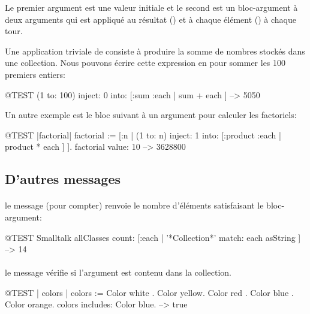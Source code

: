 \documentclass[a4paper,10pt,twoside]{book}
\begin{document}
Le premier argument est une valeur initiale et le second est un bloc-argument
\`a deux arguments qui est appliqu\'e au r\'esultat () et \`a chaque \'el\'ement () \`a chaque tour.

Une application triviale de   consiste \`a produire 
la somme de nombres stock\'es dans une collection.
Nous pouvons \'ecrire cette expression en \sq pour sommer
les 100 premiers entiers:
\begin{code}{@TEST}
(1 to: 100) inject: 0 into: [:sum :each | sum + each ] --> 5050
\end{code}

Un autre exemple est le bloc suivant \`a un argument pour calculer les factoriels:
\begin{code}{@TEST |factorial|}
factorial := [:n | (1 to: n) inject: 1 into: [:product :each | product * each ] ].
factorial value: 10 --> 3628800
\end{code}

\subsection{D'autres messages}

\paragraph{} le message  (pour compter) renvoie le nombre d'\'el\'ements satisfaisant le bloc-argument: %

\begin{code}{@TEST}
Smalltalk allClasses count: [:each | '*Collection*' match: each asString ] --> 14
\end{code}

\paragraph{} le message  v\'erifie si l'argument est contenu dans la collection.

\begin{code}{@TEST | colors |}
colors := {Color white . Color yellow. Color red . Color blue . Color orange}.
colors includes: Color blue. --> true
\end{code}
\end{document}
